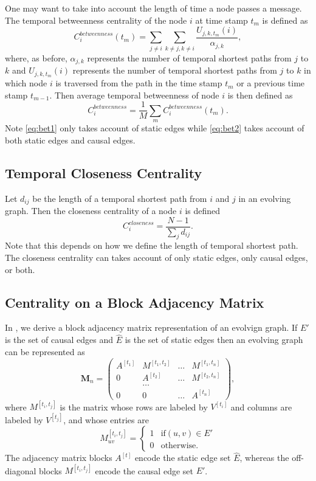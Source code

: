 \documentclass[12pt]{article}
\theoremstyle{definition}
\begin{document}
One may want to take into account the length of time a node passes a message. The temporal betweenness centrality of the node $i$ at time stamp $t_m$ is defined as
\begin{equation}
  \label{eq:bet2}
  C_i^{betweenness}(t_m) = \sum_{j\ne i}\sum_{k\ne j, k\ne i}\frac{U_{j,k,t_m}(i)}{\alpha_{j,k}},
\end{equation}
where, as before, $\alpha_{j,k}$ represents the number of temporal shortest paths from $j$ to $k$ and $U_{j,k,t_m}(i)$ represents the number of temporal shortest paths from $j$ to $k$ in which node $i$ is traversed from
the path in the time stamp $t_m$ or a previous time stamp $t_{m-1}$. Then
average temporal betweenness of node $i$ is then defined as
$$
  C_i^{betweenness} = \frac{1}{M}\sum_m C_i^{betweenness}(t_m).
$$
Note \eqref{eq:bet1} only takes account of static edges while \eqref{eq:bet2} takes account of both static edges and causal edges.


\subsection{Temporal Closeness Centrality}
\label{sec:temp-clos-centr}

Let $d_{ij}$ be the length of a temporal shortest path from $i$ and $j$ in an evolving graph. Then
the closeness centrality of a node $i$ is defined
$$
C_i^{closeness} = \frac{N-1}{\sum_j d_{ij}}.
$$
Note that this depends on how we define the length of temporal shortest path. The closeness centrality can takes account of only static edges, only causal edges, or both.


\subsection{Centrality on a Block Adjacency Matrix}
\label{sec:centr-block-adjac}

In \cite{chen16}, we derive a block adjacency matrix representation of an evolvign graph.
If $E'$ is the set of causal edges and $\hat E$ is the set of static edges then
an evolving graph can be represented as
$$
\bm M_n =
\begin{pmatrix}
A^{[t_1]} & M^{[t_1, t_2]} & \ldots & M^{[t_1, t_n]} \\
0         & A^{[t_2]} & \ldots & M^{[t_2, t_n]} \\
          & \ldots    &        &     \\
0         & 0         & \ldots & A^{[t_n]}
\end{pmatrix},
$$
where $M^{[t_i, t_j]}$ is the matrix whose rows are labeled by $V^{[t_i]}$ and columns are labeled by $V^{[t_j]}$, and whose entries are
$$
  M_{uv}^{[t_i, t_j]} =
  \begin{cases}
    1 & \mbox{if} (u, v) \in E' \\
    0 & \mbox{otherwise}.
  \end{cases}
$$
The adjacency matrix blocks $A^{[t]}$ encode the static edge set $\hat E$, whereas the off-diagonal blocks $M^{[t_i, t_j]}$ encode the causal edge set $E'$.
\end{document}

